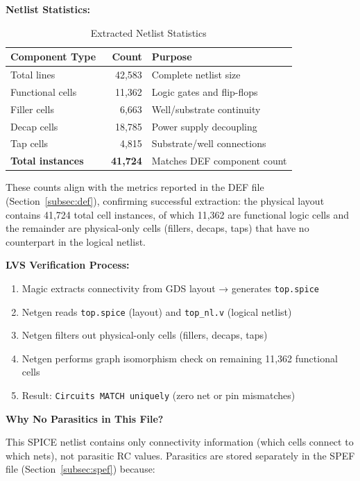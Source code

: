 \documentclass[12pt,a4paper]{article}
\begin{document}
\textbf{Netlist Statistics:}

\begin{table}[H]
\centering
\caption{Extracted Netlist Statistics}
\label{tab:spice_stats}
\begin{tabular}{@{}lrl@{}}
\toprule
\textbf{Component Type} & \textbf{Count} & \textbf{Purpose} \\
\midrule
Total lines & 42,583 & Complete netlist size \\
Functional cells & ~11,362 & Logic gates and flip-flops \\
Filler cells & ~6,663 & Well/substrate continuity \\
Decap cells & ~18,785 & Power supply decoupling \\
Tap cells & ~4,815 & Substrate/well connections \\
\midrule
\textbf{Total instances} & \textbf{~41,724} & Matches DEF component count \\
\bottomrule
\end{tabular}
\end{table}

These counts align with the metrics reported in the DEF file (Section~\ref{subsec:def}), confirming successful extraction: the physical layout contains 41,724 total cell instances, of which 11,362 are functional logic cells and the remainder are physical-only cells (fillers, decaps, taps) that have no counterpart in the logical netlist.

\textbf{LVS Verification Process:}

\begin{enumerate}
    \item Magic extracts connectivity from GDS layout → generates \texttt{top.spice}
    \item Netgen reads \texttt{top.spice} (layout) and \texttt{top\_nl.v} (logical netlist)
    \item Netgen filters out physical-only cells (fillers, decaps, taps)
    \item Netgen performs graph isomorphism check on remaining 11,362 functional cells
    \item Result: \texttt{Circuits MATCH uniquely} (zero net or pin mismatches)
\end{enumerate}

\textbf{Why No Parasitics in This File?}

This SPICE netlist contains only connectivity information (which cells connect to which nets), not parasitic RC values. Parasitics are stored separately in the SPEF file (Section~\ref{subsec:spef}) because:
\end{document}
